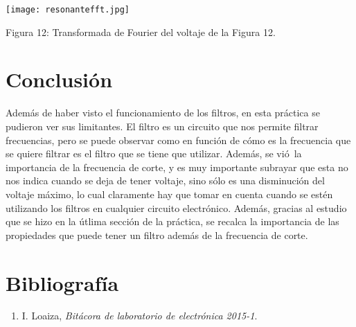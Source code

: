 \documentclass[11pt]{article}
\renewcommand{\=}[1]{\stackrel{#1}{=}} %
\theoremstyle{definition}
\theoremstyle{remark}
\begin{document}
\begin{center}
\texttt{[image: resonantefft.jpg]}
\end{center}
\begin{center}
Figura 12: Transformada de Fourier del voltaje de la Figura 12.
\end{center}

\section{Conclusi\'on}
Adem\'as de haber visto el funcionamiento de los filtros, en esta pr\'actica se pudieron ver sus limitantes. El filtro es un circuito que nos permite filtrar frecuencias, pero se puede observar como en funci\'on de c\'omo es la frecuencia que se quiere filtrar es el filtro que se tiene que utilizar. Adem\'as, se vi\'o\ la importancia de la frecuencia de corte, y es muy importante subrayar que esta no nos indica cuando se deja de tener voltaje, sino s\'olo es una disminuci\'on del voltaje m\'aximo, lo cual claramente hay que tomar en cuenta cuando se est\'en utilizando los filtros en cualquier circuito electr\'onico. Adem\'as, gracias al estudio que se hizo en la \'utlima secci\'on de la pr\'actica, se recalca la importancia de las propiedades que puede tener un filtro adem\'as de la frecuencia de corte. 


\section{Bibliograf\'ia}
\begin{enumerate}
\item I. Loaiza, \textit{Bit\'acora de laboratorio de electr\'onica 2015-1}.
\end{enumerate}
\end{document}
